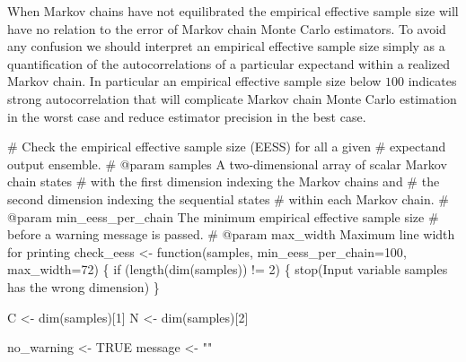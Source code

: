 \documentclass[
  letterpaper,
  DIV=11,
  numbers=noendperiod]{scrartcl}
\newenvironment{Shaded}{\begin{snugshade}}{\end{snugshade}}
\newcommand{\CommentTok}[1]{\textcolor[rgb]{0.37,0.37,0.37}{#1}}
\newcommand{\ControlFlowTok}[1]{\textcolor[rgb]{0.00,0.23,0.31}{#1}}
\newcommand{\DecValTok}[1]{\textcolor[rgb]{0.68,0.00,0.00}{#1}}
\newcommand{\NormalTok}[1]{\textcolor[rgb]{0.00,0.23,0.31}{#1}}
\newcommand{\OperatorTok}[1]{\textcolor[rgb]{0.37,0.37,0.37}{#1}}
\newcommand{\StringTok}[1]{\textcolor[rgb]{0.13,0.47,0.30}{#1}}
\begin{document}
When Markov chains have not equilibrated the empirical effective sample
size will have no relation to the error of Markov chain Monte Carlo
estimators. To avoid any confusion we should interpret an empirical
effective sample size simply as a quantification of the autocorrelations
of a particular expectand within a realized Markov chain. In particular
an empirical effective sample size below \(100\) indicates strong
autocorrelation that will complicate Markov chain Monte Carlo estimation
in the worst case and reduce estimator precision in the best case.

\begin{Shaded}
\begin{Highlighting}[]
\CommentTok{\# Check the empirical effective sample size (EESS) for all a given }
\CommentTok{\# expectand output ensemble.}
\CommentTok{\# @param samples A two{-}dimensional array of scalar Markov chain states }
\CommentTok{\#                with the first dimension indexing the Markov chains and }
\CommentTok{\#                the second dimension indexing the sequential states }
\CommentTok{\#                within each Markov chain.}
\CommentTok{\# @param min\_eess\_per\_chain The minimum empirical effective sample size}
\CommentTok{\#                           before a warning message is passed.}
\CommentTok{\# @param max\_width Maximum line width for printing}
\NormalTok{check\_eess }\OperatorTok{\textless{}{-}}\NormalTok{ function(samples,}
\NormalTok{                       min\_eess\_per\_chain}\OperatorTok{=}\DecValTok{100}\NormalTok{,}
\NormalTok{                       max\_width}\OperatorTok{=}\DecValTok{72}\NormalTok{) \{}
  \ControlFlowTok{if}\NormalTok{ (length(dim(samples)) }\OperatorTok{!=} \DecValTok{2}\NormalTok{) \{}
\NormalTok{    stop(}\StringTok{\textquotesingle{}Input variable \textasciigrave{}samples\textasciigrave{} has the wrong dimension\textquotesingle{}}\NormalTok{)}
\NormalTok{  \}}
  
\NormalTok{  C }\OperatorTok{\textless{}{-}}\NormalTok{ dim(samples)[}\DecValTok{1}\NormalTok{]}
\NormalTok{  N }\OperatorTok{\textless{}{-}}\NormalTok{ dim(samples)[}\DecValTok{2}\NormalTok{]}
  
\NormalTok{  no\_warning }\OperatorTok{\textless{}{-}}\NormalTok{ TRUE}
\NormalTok{  message }\OperatorTok{\textless{}{-}} \StringTok{""}
  

\end{Highlighting}
\end{Shaded}
\end{document}
